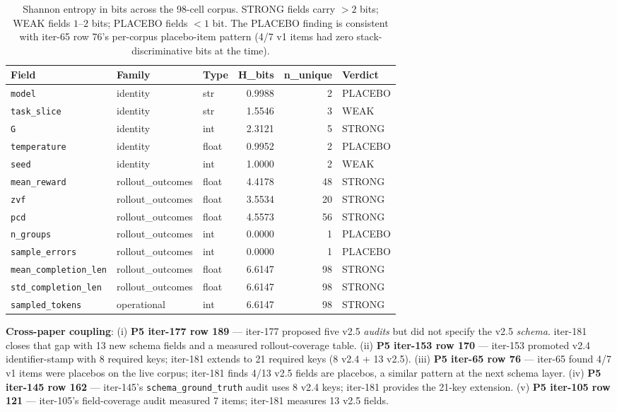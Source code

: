 \begin{table}[h]
\centering\scriptsize
\begin{tabular}{lllrrl}
\hline
\textbf{Field} & \textbf{Family} & \textbf{Type} & \textbf{H\_bits} & \textbf{n\_unique} & \textbf{Verdict} \\
\hline
\texttt{model}                    & identity        & str   & 0.9988 & 2  & PLACEBO \\
\texttt{task\_slice}               & identity        & str   & 1.5546 & 3  & WEAK    \\
\texttt{G}                        & identity        & int   & 2.3121 & 5  & STRONG  \\
\texttt{temperature}              & identity        & float & 0.9952 & 2  & PLACEBO \\
\texttt{seed}                     & identity        & int   & 1.0000 & 2  & WEAK    \\
\texttt{mean\_reward}             & rollout\_outcomes & float & 4.4178 & 48 & STRONG  \\
\texttt{zvf}                      & rollout\_outcomes & float & 3.5534 & 20 & STRONG  \\
\texttt{pcd}                      & rollout\_outcomes & float & 4.5573 & 56 & STRONG  \\
\texttt{n\_groups}                & rollout\_outcomes & int   & 0.0000 & 1  & PLACEBO \\
\texttt{sample\_errors}           & rollout\_outcomes & int   & 0.0000 & 1  & PLACEBO \\
\texttt{mean\_completion\_len}    & rollout\_outcomes & float & 6.6147 & 98 & STRONG  \\
\texttt{std\_completion\_len}     & rollout\_outcomes & float & 6.6147 & 98 & STRONG  \\
\texttt{sampled\_tokens}          & operational     & int   & 6.6147 & 98 & STRONG  \\
\hline
\end{tabular}
\caption{Shannon entropy in bits across the 98-cell corpus. STRONG
fields carry $> 2$ bits; WEAK fields $1$--$2$ bits; PLACEBO fields
$< 1$ bit. The PLACEBO finding is consistent with iter-65 row 76's
per-corpus placebo-item pattern (4/7 v1 items had zero stack-discriminative
bits at the time).}
\label{tab:p5-v25-placebo}
\end{table}

\noindent\textbf{Cross-paper coupling}: (i) \textbf{P5 iter-177 row 189} ---
iter-177 proposed five v2.5 \emph{audits} but did not specify the v2.5
\emph{schema}. iter-181 closes that gap with 13 new schema fields and a
measured rollout-coverage table. (ii) \textbf{P5 iter-153 row 170} ---
iter-153 promoted v2.4 identifier-stamp with 8 required keys; iter-181
extends to 21 required keys (8 v2.4 + 13 v2.5). (iii) \textbf{P5 iter-65
row 76} --- iter-65 found 4/7 v1 items were placebos on the live corpus;
iter-181 finds 4/13 v2.5 fields are placebos, a similar pattern at the
next schema layer. (iv) \textbf{P5 iter-145 row 162} --- iter-145's
\texttt{schema\_ground\_truth} audit uses 8 v2.4 keys; iter-181 provides
the 21-key extension. (v) \textbf{P5 iter-105 row 121} --- iter-105's
field-coverage audit measured 7 items; iter-181 measures 13 v2.5 fields.

